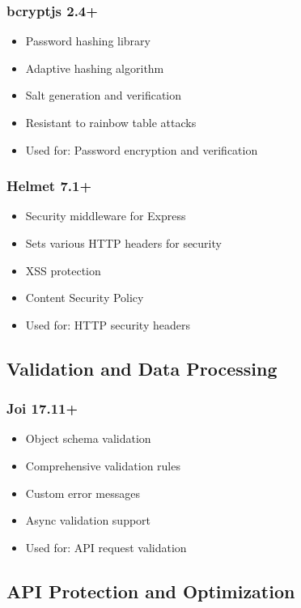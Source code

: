 \documentclass[12pt,a4paper]{report}
\begin{document}
\subsubsection{bcryptjs 2.4+}
\begin{itemize}[leftmargin=*]
    \item Password hashing library
    \item Adaptive hashing algorithm
    \item Salt generation and verification
    \item Resistant to rainbow table attacks
    \item Used for: Password encryption and verification
\end{itemize}

\subsubsection{Helmet 7.1+}
\begin{itemize}[leftmargin=*]
    \item Security middleware for Express
    \item Sets various HTTP headers for security
    \item XSS protection
    \item Content Security Policy
    \item Used for: HTTP security headers
\end{itemize}

\subsection{Validation and Data Processing}

\subsubsection{Joi 17.11+}
\begin{itemize}[leftmargin=*]
    \item Object schema validation
    \item Comprehensive validation rules
    \item Custom error messages
    \item Async validation support
    \item Used for: API request validation
\end{itemize}

\subsection{API Protection and Optimization}
\end{document}

